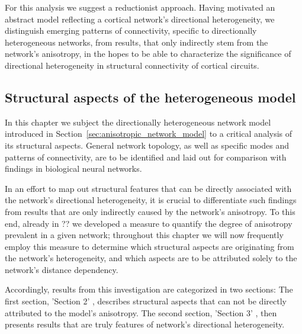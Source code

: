 For this analysis we suggest a reductionist approach. Having motivated
an abstract model reflecting a cortical network's directional
heterogeneity, we distinguish emerging patterns of connectivity,
specific to directionally heterogeneous networks, from results, that
only indirectly stem from the network's anisotropy, in the hopes to be
able to characterize the significance of directional heterogeneity in
structural connectivity of cortical circuits.


\subsection*{Structural aspects of the heterogeneous model}

In this chapter we subject the directionally heterogeneous network
model introduced in Section~\ref{sec:anisotropic_network_model} to a
critical analysis of its structural aspects. General network topology,
as well as specific modes and patterns of connectivity, are to be
identified and laid out for comparison with findings in biological
neural networks.

In an effort to map out structural features that can be directly
associated with the network's directional  heterogeneity, it is crucial to differentiate
such findings from results that are only indirectly caused by the
network's anisotropy. To this end, already in ?? we developed a
measure to quantify the degree of anisotropy prevalent in a given
network; throughout this chapter we will now frequently employ this
measure to determine which structural aspects are originating from the
network's heterogeneity, and which aspects are to be attributed solely
to the network's distance dependency.

Accordingly, results from this investigation are categorized in two
sections: The first section, 'Section 2' %
, describes structural aspects that can not be directly attributed to
the model's anisotropy. The second section, 'Section 3' %
, then presents results that are truly features of network's
directional heterogeneity.




